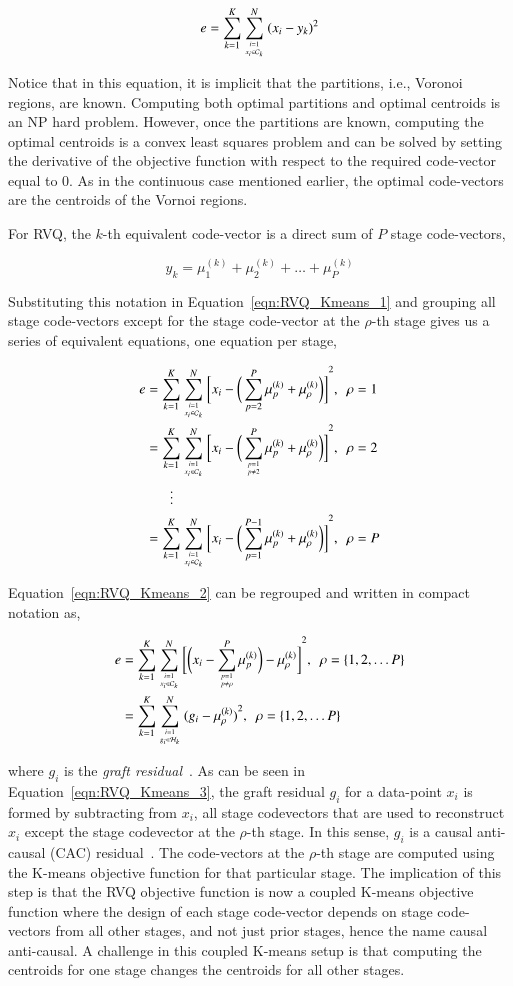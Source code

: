 \begin{equation}
e = \sum\limits_{k=1}^K \sum\limits_{{i=1 \atop x_i \in \mathcal{C}_k}}^N {(x_i - y_k)}^2
\label{eqn:RVQ_Kmeans_1}
\end{equation}

Notice that in this equation, it is implicit that the partitions, i.e., Voronoi regions, are known.  Computing both optimal partitions and optimal centroids is an NP hard problem.  However, once the partitions are known, computing the optimal centroids is a convex least squares problem and can be solved by setting the derivative of the objective function with respect to the required code-vector equal to 0.  As in the continuous case mentioned earlier, the optimal code-vectors are the centroids of the Vornoi regions.  

For RVQ, the $k$-th equivalent code-vector is a direct sum of $P$ stage code-vectors, 

\begin{equation}
y_k = \mu_1^{(k)} + \mu_2^{(k)} + \ldots + \mu_P^{(k)}
\end{equation}

Substituting this notation in Equation~\ref{eqn:RVQ_Kmeans_1} and grouping all stage code-vectors except for the stage code-vector at the $\rho$-th stage gives us a series of equivalent equations, one equation per stage,
 
\begin{align}
e&= \KmeansSum{\bigg[\RVQmultipleKmeansone\bigg]}^2, \ \ \rho=1\notag\\
&= \KmeansSum{\bigg[\RVQmultipleKmeanstwo\bigg]}^2, \ \ \rho=2\notag\\
&\ \ \ \  \ \ \ \vdots\notag\\
&=\KmeansSum{\bigg[\RVQmultipleKmeansT\bigg]}^2, \ \ \rho=P
\label{eqn:RVQ_Kmeans_2}
\end{align}


Equation~\ref{eqn:RVQ_Kmeans_2} can be regrouped and written in compact notation as,

\begin{align}
e&= \KmeansSum{\bigg[\RVQmultipleKmeansonealternate\bigg]}^2, \ \ \rho=\{1, 2, \ldots P\}\notag\\
&={\RVQerroralternate}, \ \ \rho=\{1, 2, \ldots P\}
\label{eqn:RVQ_Kmeans_3}
\end{align}

where $g_i$ is the \emph{graft residual}~\cite{1993_JNL_RVQDSC_Barnes}.   As can be seen in Equation~\ref{eqn:RVQ_Kmeans_3}, the graft residual $g_i$ for a data-point $x_i$ is formed by subtracting from $x_i$, all stage codevectors that are used to reconstruct $x_i$ except the stage codevector at the $\rho$-th stage.  In this sense, $g_i$ is a causal anti-causal (CAC) residual~\cite{1993_JNL_RVQDSC_Barnes}.  The code-vectors at the $\rho$-th stage are computed using the K-means objective function for that particular stage.  The implication of this step is that the RVQ objective function is now a coupled K-means objective function where the design of each stage code-vector depends on stage code-vectors from all other stages, and not just prior stages, hence the name causal anti-causal.    A challenge in this coupled K-means setup is that computing the centroids for one stage changes the centroids for all other stages.  

